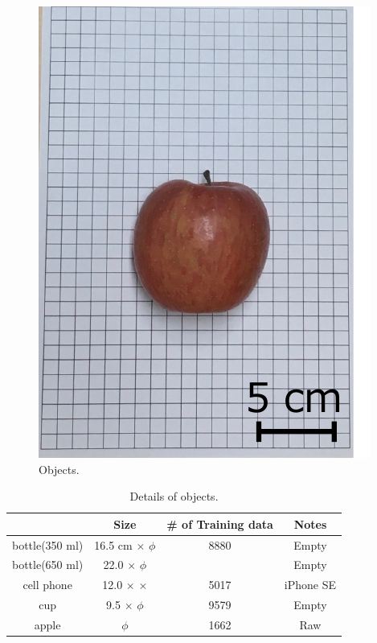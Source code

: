 \begin{figure}[H]
\begin{minipage}{0.19\columnwidth}
        \includegraphics[clip, width=\linewidth]{figure/chapter4/apple}
    \end{minipage}
    
    \caption{Objects.}
    \label{fig:対象物}
    
\end{figure}

\begin{table}[H]
    \centering
    \caption{Details of objects.}
    \begin{tabular}{cccc}\toprule
        & Size & \# of Training data & Notes \\ \midrule
        bottle(350 ml) & 16.5 cm $\times$  $\phi$ & 8880 & Empty \\ 
        bottle(650 ml) & 22.0 $\times$  $\phi$ &  & Empty \\ 
        cell phone & 12.0 $\times$  $\times$  & 5017 & iPhone SE \\ 
        cup & 9.5 $\times$  $\phi$ & 9579 & Empty \\ 
        apple & $\phi$ & 1662 & Raw \\ \bottomrule
    \end{tabular}
    \label{tab:対象物}
\end{table}


